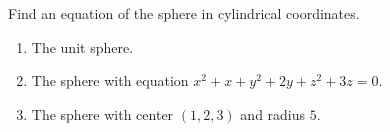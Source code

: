 Find an equation of the sphere in cylindrical coordinates.

\begin{enumerate}
\item The unit sphere.
\item The sphere with equation $x^2 +x+ y^2+2y + z^2 +3z=0$.
\item The sphere with center $(1,2,3)$ and radius $5$.
\end{enumerate}